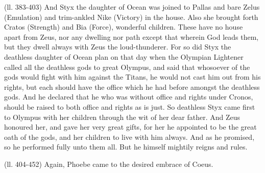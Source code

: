 (ll. 383-403) And Styx the daughter of Ocean was joined to Pallas and bare
Zelus (Emulation) and trim-ankled Nike (Victory) in the house. Also she brought
forth Cratos (Strength) and Bia (Force), wonderful children. These have no
house apart from Zeus, nor any dwelling nor path except that wherein God leads
them, but they dwell always with Zeus the loud-thunderer. For so did Styx the
deathless daughter of Ocean plan on that day when the Olympian Lightener called
all the deathless gods to great Olympus, and said that whosoever of the gods
would fight with him against the Titans, he would not cast him out from his
rights, but each should have the office which he had before amongst the
deathless gods. And he declared that he who was without office and rights under
Cronos, should be raised to both office and rights as is just. So deathless
Styx came first to Olympus with her children through the wit of her dear
father. And Zeus honoured her, and gave her very great gifts, for her he
appointed to be the great oath of the gods, and her children to live with him
always. And as he promised, so he performed fully unto them all. But he himself
mightily reigns and rules.

(ll. 404-452) Again, Phoebe came to the desired embrace of Coeus.

